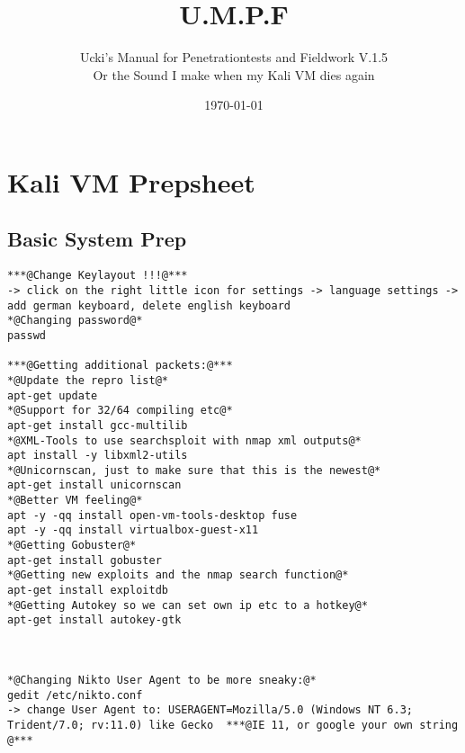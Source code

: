 \documentclass[a4paper,12pt, twoside,]{report}
\begin{document}
\newcommand{\vers}{1.5} 






\fancyhead[R]{\scriptsize{UMPF \vers}}
\title{U.M.P.F}
\date{\today}
\author{Ucki's Manual for Penetrationtests and Fieldwork V.\vers \\ \tiny{Or the Sound I make when my Kali VM dies again}}
\maketitle

\tableofcontents
\newpage




\section{Kali VM Prepsheet}
\subsection{Basic System Prep}
\begin{lstlisting}[caption={Prepping a fresh KaliVM},label=Kaliprep]
***@Change Keylayout !!!@***
-> click on the right little icon for settings -> language settings -> add german keyboard, delete english keyboard
*@Changing password@*
passwd

***@Getting additional packets:@***
*@Update the repro list@*
apt-get update
*@Support for 32/64 compiling etc@*
apt-get install gcc-multilib
*@XML-Tools to use searchsploit with nmap xml outputs@*
apt install -y libxml2-utils
*@Unicornscan, just to make sure that this is the newest@*
apt-get install unicornscan
*@Better VM feeling@*
apt -y -qq install open-vm-tools-desktop fuse
apt -y -qq install virtualbox-guest-x11
*@Getting Gobuster@*
apt-get install gobuster
*@Getting new exploits and the nmap search function@*
apt-get install exploitdb
*@Getting Autokey so we can set own ip etc to a hotkey@*
apt-get install autokey-gtk



*@Changing Nikto User Agent to be more sneaky:@*
gedit /etc/nikto.conf 
-> change User Agent to: USERAGENT=Mozilla/5.0 (Windows NT 6.3; Trident/7.0; rv:11.0) like Gecko  ***@IE 11, or google your own string @***
\end{lstlisting}
\newpage
\end{document}
